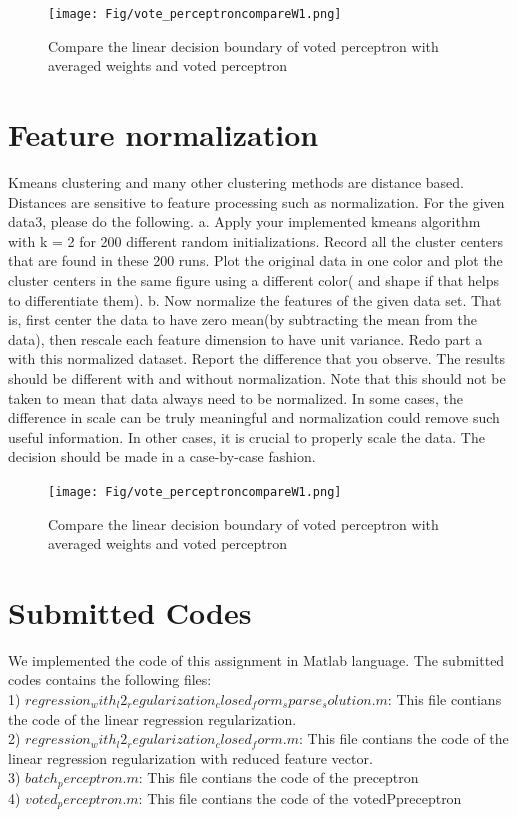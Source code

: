 \documentclass{article} %
\begin{document}
\begin{figure}[h]
\begin{center}
\texttt{[image: Fig/vote\_perceptroncompareW1.png]}
 \end{center}
\caption{\small{Compare the linear decision boundary of voted perceptron with averaged weights and voted perceptron}} 
\label{fig:vote_perceptroncompareW1}
\end{figure}

\section{Feature normalization}
Kmeans clustering and many other clustering methods are distance based. Distances are sensitive to feature processing such as normalization. For the given data3, please do the following.
a. Apply your implemented kmeans algorithm with k = 2 for 200 different random initializations. Record all the cluster centers that are found in these 200 runs. Plot the original data in one color and plot the cluster centers in the same figure using a different color( and shape if that helps to differentiate them).
b. Now normalize the features of the given data set. That is, first center the data to have zero mean(by subtracting the mean from the data), then rescale each feature dimension to have unit variance. Redo part a with this normalized dataset. Report the difference that you observe.
The results should be different with and without normalization. Note that this should not be taken to mean that data always need to be normalized. In some cases, the difference in scale can be truly meaningful and normalization could remove such useful information. In other cases, it is crucial to properly scale the data. The decision should be made in a case-by-case fashion.

\begin{figure}[h]
\begin{center}
\texttt{[image: Fig/vote\_perceptroncompareW1.png]}
 \end{center}
\caption{\small{Compare the linear decision boundary of voted perceptron with averaged weights and voted perceptron}} 
\label{fig:vote_perceptroncompareW1}
\end{figure}


\section{Submitted Codes}
We implemented the  code of this assignment in Matlab language. The submitted codes contains the following files:\\
 1) $regression_with_l2_regularization_closed_form_sparse_solution.m$: This file contians the code of the linear regression regularization.\\
 2) $regression_with_l2_regularization_closed_form.m$: This file contians the code of the linear regression regularization with reduced feature vector.\\
 3) $batch_perceptron.m$: This file contians the code of the preceptron\\
 4) $voted_perceptron.m$: This file contians the code of the votedPpreceptron\\
 
\end{document}
